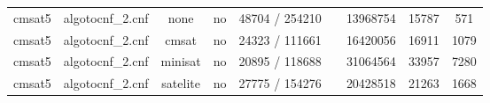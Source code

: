 \begin{appendices}
\begin{table}[p]
\begin{center}
\begin{tabular}{l|cccccccc}
  cmsat5                         & algotocnf\_2.cnf               & none       & no    & 48704 / 254210 &           & 13968754  & 15787      & 571 \\ %
  cmsat5                         & algotocnf\_2.cnf               & cmsat      & no    & 24323 / 111661 &           & 16420056  & 16911      & 1079 \\ %
  cmsat5                         & algotocnf\_2.cnf               & minisat    & no    & 20895 / 118688 &           & 31064564  & 33957      & 7280 \\ %
  cmsat5                         & algotocnf\_2.cnf               & satelite   & no    & 27775 / 154276 &           & 20428518  & 21263      & 1668 \\ %
    \end{tabular}
  \end{center}
\end{table}

\newpage


\end{appendices}
